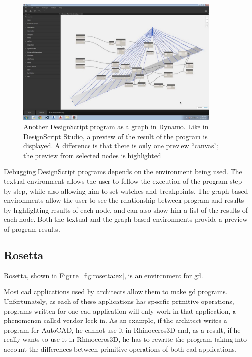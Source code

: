 \begin{figure}
	\centering
	\includegraphics[width=0.9\textwidth]{images/ds_dynamo}
	\caption[Another DesignScript program as a graph in Dynamo. Like in DesignScript Studio, a preview of the result of the program is displayed.]{Another DesignScript program as a graph in Dynamo. Like in DesignScript Studio, a preview of the result of the program is displayed. A difference is that there is only one preview ``canvas''; the preview from selected nodes is highlighted.}
	\label{fig:ds:dynamo}
\end{figure}

Debugging DesignScript programs depends on the environment being used.
The textual environment allows the user to follow the execution of the program step-by-step, while also allowing him to set watches and breakpoints.
The graph-based environments allow the user to see the relationship between program and results by highlighting results of each node, and can also show him a list of the results of each node.
Both the textual and the graph-based environments provide a preview of program results.


\subsection{Rosetta}
\label{section:rosetta:related}
Rosetta\cite{de2012modern,lopes2011portable}, shown in Figure~\ref{fig:rosetta:ex}, is an environment for \gls{gd}.

Most \gls{cad} applications used by architects allow them to make \gls{gd} programs.
Unfortunately, as each of these applications has specific primitive operations, programs written for one \gls{cad} application will only work in that application, a phenomenon called vendor lock-in.
As an example, if the architect writes a program for AutoCAD, he cannot use it in Rhinoceros3D and, as a result, if he really wants to use it in Rhinoceros3D, he has to rewrite the program taking into account the differences between primitive operations of both \gls{cad} applications.

